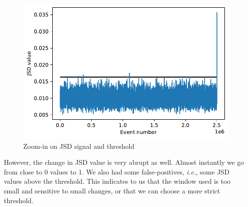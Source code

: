 \documentclass[sigconf]{acmart}
\begin{document}
\begin{figure}[!htb]
    \begin{center}
      \includegraphics[scale=0.5]{figures/stream-analysis-viz-zoom-625.pdf}
      \caption{Zoom-in on JSD signal and threshold}
     \label{fig:JSD-signal-zoom-01}
    \end{center}
\end{figure}
However, the change in JSD value is very abrupt as well. Almost instantly we go from close to 0 values to 1. We also had some false-positives, \textit{i.e.}, some JSD values above the threshold. This indicates to us that the window used is too small and sensitive to small changes, or that we can choose a more strict threshold.
\end{document}

